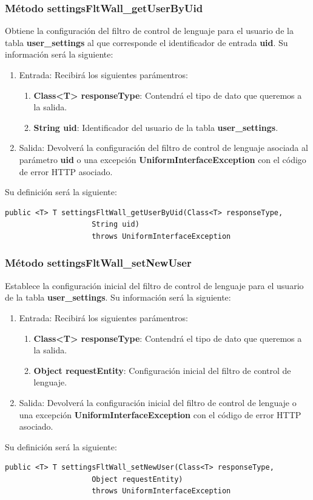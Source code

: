 \subsubsection{Método settingsFltWall\_getUserByUid}
Obtiene la configuración del filtro de control de lenguaje para el usuario de la tabla \textbf{user\_settings} al que corresponde el identificador de entrada \textbf{uid}. Su información será la siguiente:
\begin{enumerate}
\item Entrada: Recibirá los siguientes parámentros:
\begin{enumerate}
\item \textbf{Class<T> responseType}: Contendrá el tipo de dato que queremos a la salida. 
\item \textbf{String uid}: Identificador del usuario de la tabla \textbf{user\_settings}.
\end{enumerate}
\item Salida: Devolverá la configuración del filtro de control de lenguaje asociada al parámetro \textbf{uid} o una excepción \textbf{UniformInterfaceException} con el código de error HTTP asociado.
\end{enumerate}
\bigskip
\par
Su definición será la siguiente:
\begin{verbatim}public <T> T settingsFltWall_getUserByUid(Class<T> responseType, 
					String uid) 
					throws UniformInterfaceException\end{verbatim}

\subsubsection{Método settingsFltWall\_setNewUser}
Establece la configuración inicial del filtro de control de lenguaje para el usuario de la tabla \textbf{user\_settings}. Su información será la siguiente:
\begin{enumerate}
\item Entrada: Recibirá los siguientes parámentros:
\begin{enumerate}
\item \textbf{Class<T> responseType}: Contendrá el tipo de dato que queremos a la salida. 
\item \textbf{Object requestEntity}: Configuración inicial del filtro de control de lenguaje.
\end{enumerate}
\item Salida: Devolverá la configuración inicial del filtro de control de lenguaje o una excepción \textbf{UniformInterfaceException} con el código de error HTTP asociado.
\end{enumerate}
\bigskip
\par
Su definición será la siguiente:
\begin{verbatim}public <T> T settingsFltWall_setNewUser(Class<T> responseType, 
					Object requestEntity) 
					throws UniformInterfaceException\end{verbatim}


